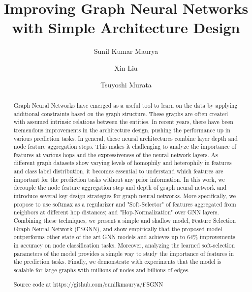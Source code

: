 \documentclass[sigconf,natbib=false]{acmart}
\begin{document}
\title{Improving Graph Neural Networks with Simple Architecture Design}

\author{Sunil Kumar Maurya}
\orcid{}
\author{Xin Liu}
\author{Tsuyoshi Murata}






\renewcommand{\shortauthors}{Maurya et al.}

\begin{abstract}
  Graph Neural Networks have emerged as a useful tool to learn on the data by applying additional constraints based on the graph structure. These graphs are often created with assumed intrinsic relations between the entities. In recent years, there have been tremendous improvements in the architecture design, pushing the performance up in various prediction tasks. In general, these neural architectures combine layer depth and node feature aggregation steps. This makes it challenging to analyze the importance of features at various hops and the expressiveness of the neural network layers. As different graph datasets show varying levels of homophily and heterophily in features and class label distribution, it becomes essential to understand which features are important for the prediction tasks without any prior information. In this work, we decouple the node feature aggregation step and depth of graph neural network and introduce several key design strategies for graph neural networks. More specifically, we propose to use softmax as a regularizer and "Soft-Selector" of features aggregated from neighbors at different hop distances; and "Hop-Normalization" over GNN layers. Combining these techniques, we present a simple and shallow model, Feature Selection Graph Neural Network (FSGNN), and show empirically that the proposed model outperforms other state of the art GNN models and achieves up to 64\% improvements in accuracy on node classification tasks. Moreover, analyzing the learned soft-selection parameters of the model provides a simple way to study the importance of features in the prediction tasks. Finally, we demonstrate with experiments that the model is scalable for large graphs with millions of nodes and billions of edges.
  
  Source code at https://github.com/sunilkmaurya/FSGNN
\end{abstract}
\end{document}
